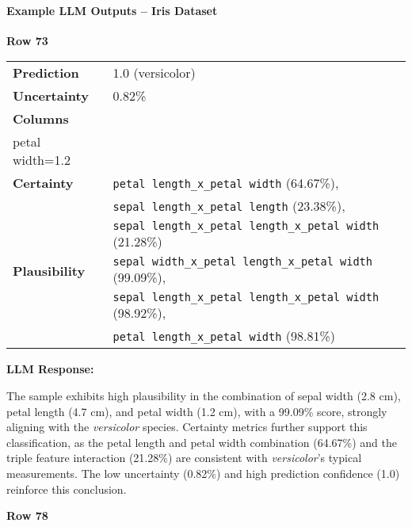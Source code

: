 \paragraph{Example LLM Outputs – Iris Dataset}

\begin{adjustwidth}{0.5cm}{0.5cm}

\textbf{Row 73}
\vspace{0.3em}

\begin{tabularx}{\textwidth}{@{}lX@{}}
\toprule
\textbf{Prediction} & 1.0 (versicolor) \\
\textbf{Uncertainty} & 0.82\% \\
\textbf{Columns} & \begin{tabular}[t]{@{}l@{}}
sepal length=6.1, sepal width=2.8, petal length=4.7,\\ petal width=1.2
\end{tabular} \\
\textbf{Certainty} & \texttt{petal length\_x\_petal width} (64.67\%),\\
& \texttt{sepal length\_x\_petal length} (23.38\%),\\
& \texttt{sepal length\_x\_petal length\_x\_petal width} (21.28\%) \\
\textbf{Plausibility} & \texttt{sepal width\_x\_petal length\_x\_petal width} (99.09\%),\\
& \texttt{sepal length\_x\_petal length\_x\_petal width} (98.92\%),\\
& \texttt{petal length\_x\_petal width} (98.81\%) \\
\bottomrule
\end{tabularx}

\vspace{0.5em}
\noindent\textbf{LLM Response:}

The sample exhibits high plausibility in the combination of sepal width (2.8 cm), petal length (4.7 cm), and petal width (1.2 cm), with a 99.09\% score, strongly aligning with the \textit{versicolor} species. Certainty metrics further support this classification, as the petal length and petal width combination (64.67\%) and the triple feature interaction (21.28\%) are consistent with \textit{versicolor}'s typical measurements. The low uncertainty (0.82\%) and high prediction confidence (1.0) reinforce this conclusion.

\vspace{1em}
\textbf{Row 78}
\vspace{0.3em}


\end{adjustwidth}
